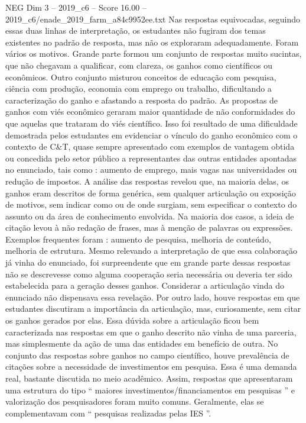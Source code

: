 \begin{textsample}{NEG Dim 3 – 2019\_c6 – Score 16.00 – 2019\_c6/enade\_2019\_farm\_a84c9952ee.txt}
Nas respostas equivocadas, seguindo essas duas linhas de interpretação, os estudantes não fugiram dos temas existentes no padrão de resposta, mas não os exploraram adequadamente.
Foram vários os motivos.
Grande parte formou um conjunto de respostas muito sucintas, que não chegavam a qualificar, com clareza, os ganhos como científicos ou econômicos.
Outro conjunto misturou conceitos de educação com pesquisa, ciência com produção, economia com emprego ou trabalho, dificultando a caracterização do ganho e afastando a resposta do padrão.
As propostas de ganhos com viés econômico geraram maior quantidade de não conformidades do que aquelas que trataram do viés científico.
Isso foi resultado de uma dificuldade demostrada pelos estudantes em evidenciar o vínculo do ganho econômico com o contexto de C\&T, quase sempre apresentado com exemplos de vantagem obtida ou concedida pelo setor público a representantes das outras entidades apontadas no enunciado, tais como : aumento de emprego, mais vagas nas universidades ou redução de impostos.
A análise das respostas revelou que, na maioria delas, os ganhos eram descritos de forma genérica, sem qualquer articulação ou exposição de motivos, sem indicar como ou de onde surgiam, sem especificar o contexto do assunto ou da área de conhecimento envolvida.
Na maioria dos casos, a ideia de citação levou à não redação de frases, mas à menção de palavras ou expressões.
Exemplos frequentes foram : aumento de pesquisa, melhoria de conteúdo, melhoria de estrutura.
Mesmo relevando a interpretação de que essa colaboração já vinha do enunciado, foi surpreendente que em grande parte dessas respostas não se descrevesse como alguma cooperação seria necessária ou deveria ter sido estabelecida para a geração desses ganhos.
Considerar a articulação vinda do enunciado não dispensava essa revelação.
Por outro lado, houve respostas em que estudantes discutiram a importância da articulação, mas, curiosamente, sem citar os ganhos gerados por elas.
Essa dúvida sobre a articulação ficou bem caracterizada nas respostas em que o ganho descrito não vinha de uma parceria, mas simplesmente da ação de uma das entidades em benefício de outra.
No conjunto das respostas sobre ganhos no campo científico, houve prevalência de citações sobre a necessidade de investimentos em pesquisa.
Essa é uma demanda real, bastante discutida no meio acadêmico.
Assim, respostas que apresentaram uma estrutura do tipo “ maiores investimentos/financiamentos em pesquisas ” e valorização dos pesquisadores foram muito comuns.
Geralmente, elas se complementavam com “ pesquisas realizadas pelas IES ”.

\end{textsample}
